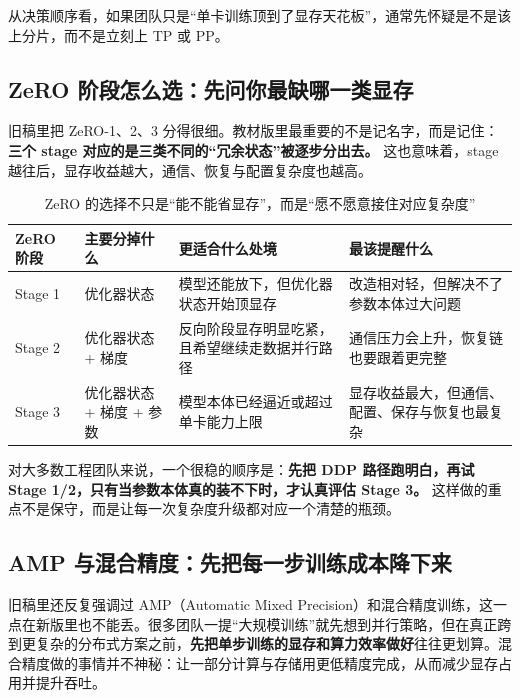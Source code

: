 从决策顺序看，如果团队只是“单卡训练顶到了显存天花板”，通常先怀疑是不是该上分片，而不是立刻上 TP 或 PP。

\subsection{ZeRO 阶段怎么选：先问你最缺哪一类显存}
旧稿里把 ZeRO-1、2、3 分得很细。教材版里最重要的不是记名字，而是记住：\textbf{三个 stage 对应的是三类不同的“冗余状态”被逐步分出去。} 这也意味着，stage 越往后，显存收益越大，通信、恢复与配置复杂度也越高。

\begin{table}[H]
\centering
\small
\begin{tabularx}{\textwidth}{>{\raggedright\arraybackslash}p{2.4cm}>{\raggedright\arraybackslash}p{3.4cm}>{\raggedright\arraybackslash}p{2.8cm}>{\raggedright\arraybackslash}X}
\toprule
\textbf{ZeRO 阶段} & \textbf{主要分掉什么} & \textbf{更适合什么处境} & \textbf{最该提醒什么} \\
\midrule
Stage 1 & 优化器状态 & 模型还能放下，但优化器状态开始顶显存 & 改造相对轻，但解决不了参数本体过大问题 \\
Stage 2 & 优化器状态 + 梯度 & 反向阶段显存明显吃紧，且希望继续走数据并行路径 & 通信压力会上升，恢复链也要跟着更完整 \\
Stage 3 & 优化器状态 + 梯度 + 参数 & 模型本体已经逼近或超过单卡能力上限 & 显存收益最大，但通信、配置、保存与恢复也最复杂 \\
\bottomrule
\end{tabularx}
\caption{ZeRO 的选择不只是“能不能省显存”，而是“愿不愿意接住对应复杂度”}
\label{tab:zero-stage-selection}
\end{table}

对大多数工程团队来说，一个很稳的顺序是：\textbf{先把 DDP 路径跑明白，再试 Stage 1/2，只有当参数本体真的装不下时，才认真评估 Stage 3。} 这样做的重点不是保守，而是让每一次复杂度升级都对应一个清楚的瓶颈。

\subsection{AMP 与混合精度：先把每一步训练成本降下来}
旧稿里还反复强调过 AMP（Automatic Mixed Precision）和混合精度训练，这一点在新版里也不能丢。很多团队一提“大规模训练”就先想到并行策略，但在真正跨到更复杂的分布式方案之前，\textbf{先把单步训练的显存和算力效率做好}往往更划算。混合精度做的事情并不神秘：让一部分计算与存储用更低精度完成，从而减少显存占用并提升吞吐。

